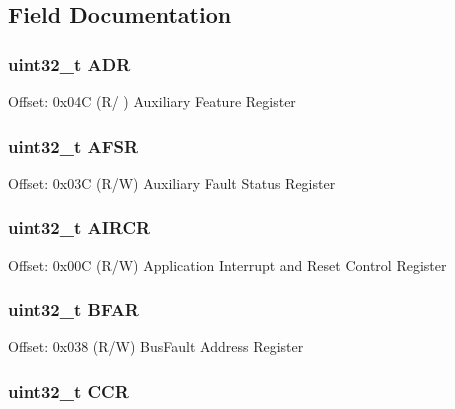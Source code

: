 \subsection{Field Documentation}
\hypertarget{struct_s_c_b___type_a5c0e2e1c7195d4dc09a5ca077c596318}{
\subsubsection[{A\-D\-R}]{ uint32\-\_\-t A\-D\-R}}\label{struct_s_c_b___type_a5c0e2e1c7195d4dc09a5ca077c596318}
Offset\-: 0x04\-C (R/ ) Auxiliary Feature Register \hypertarget{struct_s_c_b___type_ab9176079ea223dd8902589da91af63a2}{
\subsubsection[{A\-F\-S\-R}]{ uint32\-\_\-t A\-F\-S\-R}}\label{struct_s_c_b___type_ab9176079ea223dd8902589da91af63a2}
Offset\-: 0x03\-C (R/\-W) Auxiliary Fault Status Register \hypertarget{struct_s_c_b___type_aaec159b48828355cb770049b8b2e8d91}{
\subsubsection[{A\-I\-R\-C\-R}]{ uint32\-\_\-t A\-I\-R\-C\-R}}\label{struct_s_c_b___type_aaec159b48828355cb770049b8b2e8d91}
Offset\-: 0x00\-C (R/\-W) Application Interrupt and Reset Control Register \hypertarget{struct_s_c_b___type_ad49f99b1c83dcab356579af171bfa475}{
\subsubsection[{B\-F\-A\-R}]{ uint32\-\_\-t B\-F\-A\-R}}\label{struct_s_c_b___type_ad49f99b1c83dcab356579af171bfa475}
Offset\-: 0x038 (R/\-W) Bus\-Fault Address Register \hypertarget{struct_s_c_b___type_a5e1322e27c40bf91d172f9673f205c97}{
\subsubsection[{C\-C\-R}]{ uint32\-\_\-t C\-C\-R}}\label{struct_s_c_b___type_a5e1322e27c40bf91d172f9673f205c97}
